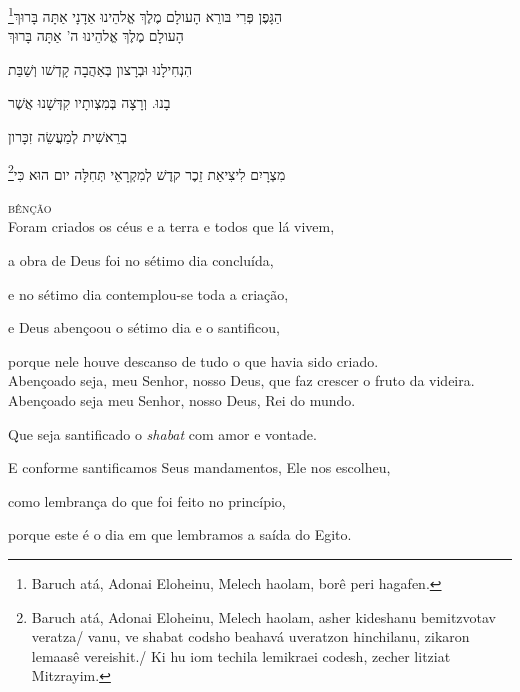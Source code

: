 \footnote{Baruch atá, Adonai Eloheinu, Melech haolam, borê peri hagafen.}הַגָּפֶן פְּרִי בּורֵא הָעולָם מֶלֶךְ אֱלהֵינוּ אַדָנָי אַתָּה בָּרוּךְ\\[10pt] 

הָעולָם מֶלֶךְ אֱלהֵינוּ ה' אַתָּה בָּרוּךְ

הִנְחִילָנוּ וּבְרָצון בְּאַהֲבָה קָדְשׁו וְשַׁבַּת

בָנוּ. וְרָצָה בְּמִצְותָיו קִדְּשָׁנוּ אֲשֶׁר

בְרֵאשִׁית לְמַעֲשֵׂה זִכָּרון

\footnote{Baruch atá, Adonai Eloheinu, Melech haolam, asher kideshanu bemitzvotav veratza/
vanu, ve shabat codsho beahavá uveratzon hinchilanu, zikaron lemaasê vereishit./
Ki hu iom techila lemikraei codesh, zecher litziat Mitzrayim.}מִצְרָיִם לִיצִיאַת זֵכֶר קדֶשׁ לְמִקְרָאֵי תְּחִלָּה יום הוּא כִּי\\[10pt]


\movetooddpage
\raggedright

\vspace*{1cm}

\textsc{bênção}\\[15pt]

Foram criados os céus e a terra e todos que lá vivem,

a obra de Deus foi no sétimo dia concluída,

e no sétimo dia contemplou-se toda a criação,

e Deus abençoou o sétimo dia e o santificou,

porque nele houve descanso \qb{}de tudo o que havia sido criado.\\[10pt]

Abençoado seja, meu Senhor, nosso Deus, \qb{}que faz crescer o fruto da videira.\\[10pt]

Abençoado seja meu Senhor, nosso Deus, Rei do mundo.

Que seja santificado o \textit{shabat} com amor e vontade.

E conforme santificamos Seus mandamentos, \qb{}Ele nos escolheu,

como lembrança do que foi feito no princípio,

porque este é o dia em que lembramos a saída do Egito.\\[10pt]


\movetoevenpage
\raggedleft

\vspace*{1cm}


